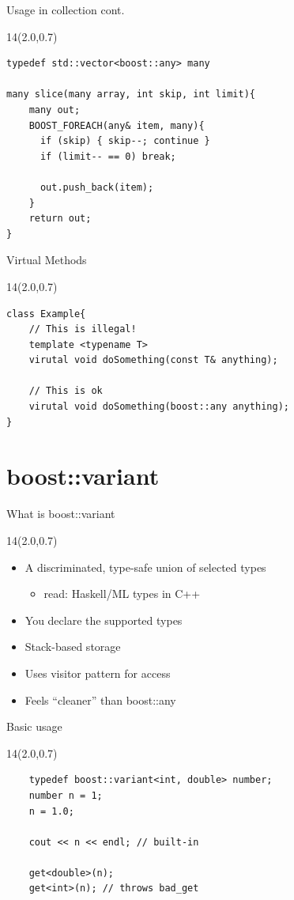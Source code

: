 \documentclass{beamer}
\newcommand{\MongoLogo}{
\begin{textblock}{14}(2.0,0.7)
\end{textblock}
}
\begin{document}
\begin{frame}[fragile] {Usage in collection cont.}
  \MongoLogo

  \begin{lstlisting}
typedef std::vector<boost::any> many

many slice(many array, int skip, int limit){
    many out;
    BOOST_FOREACH(any& item, many){
      if (skip) { skip--; continue }
      if (limit-- == 0) break;

      out.push_back(item);
    }
    return out;
}
  \end{lstlisting}

\end{frame}

\begin{frame}[fragile] {Virtual Methods}
  \MongoLogo

  \begin{lstlisting}
class Example{
    // This is illegal!
    template <typename T>
    virutal void doSomething(const T& anything);

    // This is ok
    virutal void doSomething(boost::any anything);
}
  \end{lstlisting}
\end{frame}

\section{boost::variant}
\begin{frame}{What is boost::variant}
  \MongoLogo
  \begin{itemize}
    \item A discriminated, type-safe union of selected types
      \begin{itemize}
        \item read: Haskell/ML types in C++
      \end{itemize}
    \item You declare the supported types
    \item Stack-based storage
    \item Uses visitor pattern for access
    \item Feels ``cleaner'' than boost::any
  \end{itemize}
\end{frame}

\begin{frame}[fragile] {Basic usage}
  \MongoLogo
  \begin{lstlisting}
    typedef boost::variant<int, double> number;
    number n = 1;
    n = 1.0;
    
    cout << n << endl; // built-in

    get<double>(n);
    get<int>(n); // throws bad_get
  \end{lstlisting}
\end{frame}
\end{document}
